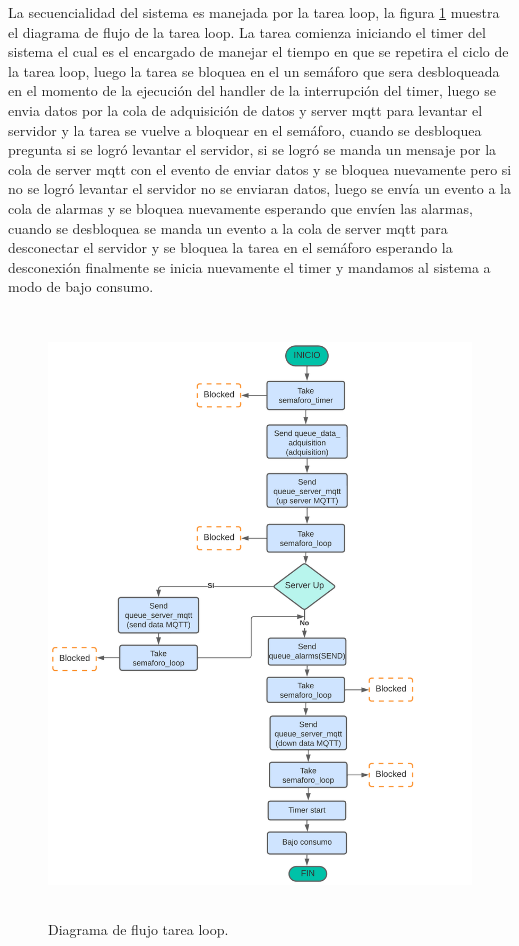 La secuencialidad del sistema es manejada por la tarea loop, la figura \ref{fig:Df tarea loop sistema} muestra el diagrama de flujo de la tarea loop.
La tarea comienza iniciando el timer del sistema el cual es el encargado de manejar el tiempo en que se repetira el ciclo de la tarea loop, luego la tarea se bloquea en el un semáforo que sera desbloqueada en el momento de la ejecución del handler de la interrupción del timer, luego se envia datos por la cola de adquisición de datos y server mqtt para levantar el servidor y la tarea se vuelve a bloquear en el semáforo, cuando se desbloquea pregunta si se logró levantar el servidor, si se logró se manda un mensaje por la cola de server mqtt con el evento de enviar datos y se bloquea nuevamente pero si no se logró levantar el servidor no se enviaran datos, luego se envía un evento a la cola de alarmas y  se bloquea nuevamente esperando que envíen las alarmas, cuando se desbloquea se manda un evento a la cola de server mqtt para desconectar el servidor y se bloquea la tarea en el semáforo esperando la desconexión  finalmente se inicia nuevamente el timer y mandamos al sistema a modo de bajo consumo.

\begin{figure}[h]  
\centering
	\includegraphics[width=12cm, height=16cm]{./Figures/DF task loop.png}
	\caption{Diagrama de flujo tarea loop.}
	\label{fig:Df tarea loop sistema}
\end{figure}

